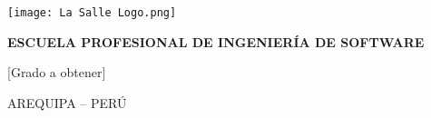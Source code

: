\begin{titlepage}

    \texttt{[image: La Salle Logo.png]}
    
        \begin{center}
            \vspace*{1cm}
            \large{\textbf{ESCUELA PROFESIONAL DE INGENIERÍA DE SOFTWARE}}
            
            
            \vspace{1.5cm}
            \makeatletter
            \large{\@title}
            \makeatother
            
            
            \vspace{1.5cm}
            \makeatletter
            \@author
            \makeatother
            
            \vspace{1.5cm}
            [Grado a obtener]
            
            \vfill
            
            AREQUIPA – PERÚ
            
            \vspace{0.5cm}
            \makeatletter
            \@date
            \makeatother
        \end{center}

\end{titlepage}